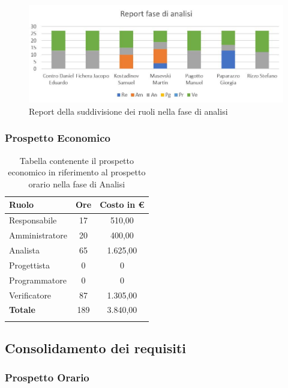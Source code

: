 \documentclass[../piano_di_progetto.tex]{subfiles}
\begin{document}
\begin{figure}[H]
\centering
\includegraphics[width=12cm]{src/img/report/report_analisi}
\caption{Report della suddivisione dei ruoli nella fase di analisi}
\end{figure}

\newpage

\subsubsection{Prospetto Economico}


\begin{longtable}{|l|c|c|}
	\hline
	\rowcolor{lightgray}
	\textbf{Ruolo} & \textbf{Ore} & \textbf{Costo in €}\\
	\endhead
	\hline
	Responsabile & 17 & 510,00 \\
	Amministratore & 20 & 400,00 \\
	Analista & 65 & 1.625,00 \\
	Progettista & 0 & 0 \\
	Programmatore & 0 & 0 \\
	Verificatore & 87 & 1.305,00 \\
	\hline
	\textbf{Totale} & 189 & 3.840,00 \\
	\hline
	\rowcolor{white}
	\caption{Tabella contenente il prospetto economico in riferimento al prospetto orario nella fase di Analisi} 
\end{longtable}


\subsection{Consolidamento dei requisiti}%
\label{sub:fase_cons}
\subsubsection{Prospetto Orario}
\end{document}
